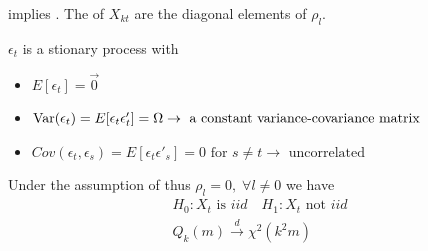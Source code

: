  implies . The  of $X_{kt}$ are the diagonal elements of $\rho_l$.
\begin{definition}
     $\epsilon_t$ is a stionary process with 
    \begin{itemize}
        \item $E[\epsilon_t] = \vec{0}$
        \item $\operatorname{Var}(\epsilon_t) = E[\epsilon_t \epsilon'_t] = \Omega \to \text{ a constant variance-covariance matrix}$
        \item $Cov(\epsilon_t, \epsilon_s) = E[\epsilon_t \epsilon'_s] = 0 \text{ for } s\neq t\to\text{ uncorrelated}$
    \end{itemize}
\end{definition}

Under the assumption of  thus $\rho_l = 0, \;\forall l\neq 0$ we have 
\begin{gather*}
    H_0: X_t \text{ is } iid \quad H_1 : X_t \text{ not } iid\\
    Q_k(m) \xrightarrow{d} \chi^2(k^2 m)
\end{gather*}

